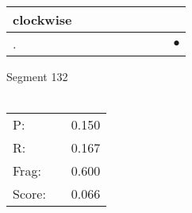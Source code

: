 \documentclass[landscape]{article}
\newcommand{\ssp}{\hspace{2pt}}
\newcommand{\mex}{\cellcolor{g}$\bullet$}
\begin{document}
\begin{tabular}{|l|p{10pt}|p{10pt}|p{10pt}|p{10pt}|p{10pt}|p{10pt}|p{10pt}|p{10pt}|}
\hline
\ssp clockwise \ssp&\hspace{2pt}&\hspace{2pt}&\hspace{2pt}&\hspace{2pt}&\hspace{2pt}&\hspace{2pt}&\hspace{2pt}&\hspace{2pt}\\
\hline
\ssp \cellcolor{ref7}. \ssp&\hspace{2pt}&\hspace{2pt}&\hspace{2pt}&\hspace{2pt}&\hspace{2pt}&\hspace{2pt}&\hspace{2pt}&\hspace{2pt}\mex\\
\hline
\end{tabular}

\vspace{6pt}
\noindent Segment 132\\\\
\noindent\begin{tabular}{lm{12pt}r}
\hline
P:&&0.150\\
R:&&0.167\\
Frag:&&0.600\\
Score:&&0.066\\
\end{tabular}

\newpage
\end{document}
